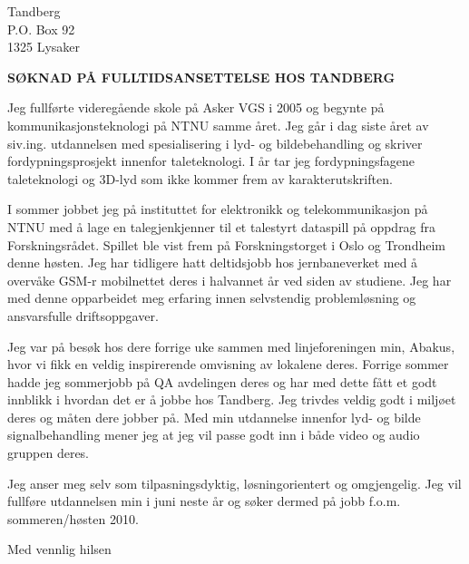 \documentclass[11pt,a4paper,norsk,nofoldinglines]{brev}
\begin{document}
\address{
	Kongsskogen 44 \\
	1385 ASKER 
}
\signature{Terje Gundersen \\  \\ +47 46 673 376}

\begin{letter}{
Tandberg \\
P.O. Box 92\\
1325 Lysaker}

\opening{\bf SØKNAD PÅ FULLTIDSANSETTELSE HOS TANDBERG}

Jeg fullførte videregående skole på Asker VGS i 2005 og begynte på kommunikasjonsteknologi på NTNU samme året. Jeg går i dag siste året av siv.ing. utdannelsen med spesialisering i lyd- og bildebehandling og skriver fordypningsprosjekt innenfor taleteknologi. I år tar jeg fordypningsfagene taleteknologi og 3D-lyd som ikke kommer frem av karakterutskriften. 

I sommer jobbet jeg på instituttet for elektronikk og telekommunikasjon på NTNU med å lage en talegjenkjenner til et talestyrt dataspill på oppdrag fra Forskningsrådet. Spillet ble vist frem på Forskningstorget i Oslo og Trondheim denne høsten. Jeg har tidligere hatt deltidsjobb hos jernbaneverket med å overvåke GSM-r mobilnettet deres i halvannet år ved siden av studiene. Jeg har med denne opparbeidet meg erfaring innen selvstendig problemløsning og ansvarsfulle driftsoppgaver.

Jeg var på besøk hos dere forrige uke sammen med linjeforeningen min, Abakus, hvor vi fikk en veldig inspirerende omvisning av lokalene deres. Forrige sommer hadde jeg sommerjobb på QA avdelingen deres og har med dette fått et godt innblikk i hvordan det er å jobbe hos Tandberg. Jeg trivdes veldig godt i miljøet deres og måten dere jobber på. Med min utdannelse innenfor lyd- og bilde signalbehandling mener jeg at jeg vil passe godt inn i både video og audio gruppen deres.

Jeg anser meg selv som tilpasningsdyktig, løsningorientert og omgjengelig. Jeg vil fullføre utdannelsen min i juni neste år og søker dermed på jobb f.o.m. sommeren/høsten 2010.

\closing{Med vennlig hilsen}

\end{letter}
\end{document}
